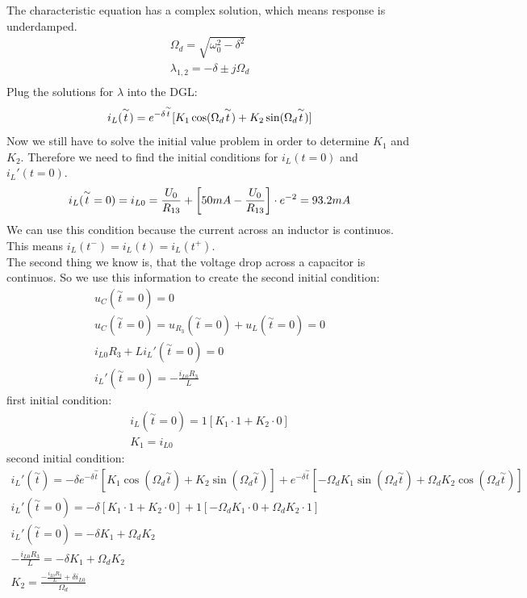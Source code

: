 \documentclass[a4paper]{article}
\begin{document}
The characteristic equation has a complex solution, which means response is underdamped.
\begin{align*}
	\Omega_d = \sqrt{\omega_0^2 - \delta^2}\\
	\lambda_{1,2} = -\delta \pm j\Omega_d\\
\end{align*}
Plug the solutions for $\lambda$ into the DGL:
\begin{equation*}
	i_L(\overset{\sim }{t}) = e^{-\delta \overset{\sim }{t}}[K_1\cos(\Omega_d\overset{\sim }{t}) + K_2\sin(\Omega_d\overset{\sim }{t})]\\
\end{equation*}
Now we still have to solve the initial value problem in order to determine $K_1$ and $K_2$.
Therefore we need to find the initial conditions for $i_L(t = 0)$ and $i_L'(t = 0)$.
\begin{equation*}
	i_L(\overset{\sim }{t} = 0) = i_{L0} = \frac{U_0}{R_{13}} + \left[50mA - \frac{U_0}{R_{13}}
	\right] \cdot e^{-2} = 93.2mA\\
\end{equation*}
We can use this condition because the current across an inductor is continuos. This means $i_L(t^-) = i_L(t) = i_L(t^+)$.\\
\pagebreak
The second thing we know is, that the voltage drop across a capacitor is continuos. So we use this information to create the second initial condition:
\begin{align*}
	u_C(\overset{\sim }{t} = 0) = 0\\
	u_C(\overset{\sim }{t} = 0) = u_{R_3}(\overset{\sim }{t} = 0) + u_L(\overset{\sim }{t} = 0) = 0\\
	i_{L0}R_3 + Li_L'(\overset{\sim }{t} = 0) = 0\\
	i_L'(\overset{\sim }{t} = 0) = -\frac{i_{L0}R_3}{L}
\end{align*}
first initial condition:
\begin{align*}
	i_L(\overset{\sim }{t} = 0) = 1[K_1 \cdot 1 + K_2\cdot 0]\\
	K_1 = i_{L0}
\end{align*}
second initial condition:
\begin{align*}
	i_L'(\overset{\sim }{t}) = -\delta e^{-\delta \overset{\sim }{t}}[K_1\cos(\Omega_d\overset{\sim }{t}) + K_2\sin(\Omega_d\overset{\sim }{t})] +
	 e^{-\delta \overset{\sim }{t}}[-\Omega_dK_1\sin(\Omega_d\overset{\sim }{t}) + \Omega_dK_2\cos(\Omega_d\overset{\sim }{t})]\\
	i_L'(\overset{\sim }{t}=0) = -\delta [K_1 \cdot 1 + K_2 \cdot 0] + 1[-\Omega_dK_1\cdot 0 + \Omega_dK_2\cdot 1]\\
	i_L'(\overset{\sim }{t}=0) = -\delta K_1 + \Omega_dK_2\\
	-\frac{i_{L0}R_3}{L} = -\delta K_1 + \Omega_dK_2\\
	K_2 = \frac{-\frac{i_{L0}R_3}{L} + \delta i_{L0}}{\Omega_d}
\end{align*}
\end{document}
